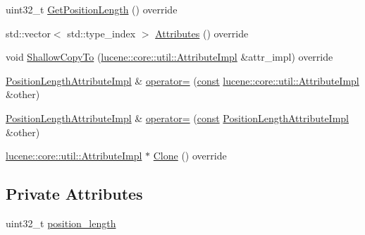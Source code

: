 \begin{DoxyCompactItemize}
\item 
uint32\+\_\+t \mbox{\hyperlink{classlucene_1_1core_1_1analysis_1_1tokenattributes_1_1PositionLengthAttributeImpl_a79dfa19c547152a263d601dfaf62fe9b}{Get\+Position\+Length}} () override
\item 
std\+::vector$<$ std\+::type\+\_\+index $>$ \mbox{\hyperlink{classlucene_1_1core_1_1analysis_1_1tokenattributes_1_1PositionLengthAttributeImpl_abb480ef419ad8ee6c27a50e7eda1be29}{Attributes}} () override
\item 
void \mbox{\hyperlink{classlucene_1_1core_1_1analysis_1_1tokenattributes_1_1PositionLengthAttributeImpl_a657ca7b71ea00d5ba609453d0333cafa}{Shallow\+Copy\+To}} (\mbox{\hyperlink{classlucene_1_1core_1_1util_1_1AttributeImpl}{lucene\+::core\+::util\+::\+Attribute\+Impl}} \&attr\+\_\+impl) override
\item 
\mbox{\hyperlink{classlucene_1_1core_1_1analysis_1_1tokenattributes_1_1PositionLengthAttributeImpl}{Position\+Length\+Attribute\+Impl}} \& \mbox{\hyperlink{classlucene_1_1core_1_1analysis_1_1tokenattributes_1_1PositionLengthAttributeImpl_a40bda49e6da62bc1c16e8ef11525d840}{operator=}} (\mbox{\hyperlink{ZlibCrc32_8h_a2c212835823e3c54a8ab6d95c652660e}{const}} \mbox{\hyperlink{classlucene_1_1core_1_1util_1_1AttributeImpl}{lucene\+::core\+::util\+::\+Attribute\+Impl}} \&other)
\item 
\mbox{\hyperlink{classlucene_1_1core_1_1analysis_1_1tokenattributes_1_1PositionLengthAttributeImpl}{Position\+Length\+Attribute\+Impl}} \& \mbox{\hyperlink{classlucene_1_1core_1_1analysis_1_1tokenattributes_1_1PositionLengthAttributeImpl_a01cf482ffe511eaa7de8b8c19690f4d7}{operator=}} (\mbox{\hyperlink{ZlibCrc32_8h_a2c212835823e3c54a8ab6d95c652660e}{const}} \mbox{\hyperlink{classlucene_1_1core_1_1analysis_1_1tokenattributes_1_1PositionLengthAttributeImpl}{Position\+Length\+Attribute\+Impl}} \&other)
\item 
\mbox{\hyperlink{classlucene_1_1core_1_1util_1_1AttributeImpl}{lucene\+::core\+::util\+::\+Attribute\+Impl}} $\ast$ \mbox{\hyperlink{classlucene_1_1core_1_1analysis_1_1tokenattributes_1_1PositionLengthAttributeImpl_a8880c22ea7f0cc06c2f7ed98900286aa}{Clone}} () override
\end{DoxyCompactItemize}
\subsection*{Private Attributes}
\begin{DoxyCompactItemize}
\item 
uint32\+\_\+t \mbox{\hyperlink{classlucene_1_1core_1_1analysis_1_1tokenattributes_1_1PositionLengthAttributeImpl_a12c90fb7e49f9b4043bfc09d66ef816d}{position\+\_\+length}}
\end{DoxyCompactItemize}
